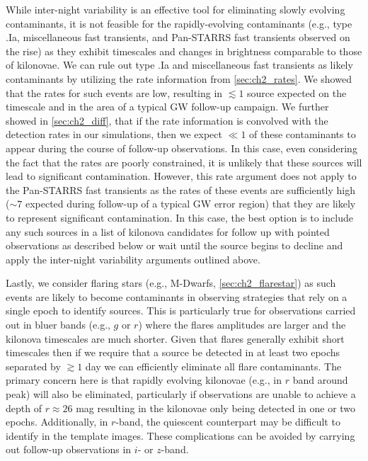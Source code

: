 While inter-night variability is an effective tool for eliminating slowly evolving contaminants, it is not feasible for the rapidly-evolving contaminants (e.g., type .Ia, miscellaneous fast transients, and Pan-STARRS fast transients observed on the rise) as they exhibit timescales and changes in brightness comparable to those of kilonovae. We can rule out type .Ia and miscellaneous fast transients as likely contaminants by utilizing the rate information from \cref{sec:ch2_rates}. We showed that the rates for such events are low, resulting in $\lesssim1$ source expected on the timescale and in the area of a typical GW follow-up campaign. We further showed in \cref{sec:ch2_diff}, that if the rate information is convolved with the detection rates in our simulations, then we expect $\ll 1$ of these contaminants to appear during the course of follow-up observations. In this case, even considering the fact that the rates are poorly constrained, it is unlikely that these sources will lead to significant contamination. However, this rate argument does not apply to the Pan-STARRS fast transients as the rates of these events are sufficiently high ($\sim 7$ expected during follow-up of a typical GW error region) that they are likely to represent significant contamination. In this case, the best option is to include any such sources in a list of kilonova candidates for follow up with pointed observations as described below or wait until the source begins to decline and apply the inter-night variability arguments outlined above.

Lastly, we consider flaring stars (e.g., M-Dwarfs, \cref{sec:ch2_flarestar}) as such events are likely to become contaminants in observing strategies that rely on a single epoch to identify sources. This is particularly true for observations carried out in bluer bands (e.g., $g$ or $r$) where the flares amplitudes are larger and the kilonova timescales are much shorter. Given that flares generally exhibit short timescales \citep[minutes to hours][]{Berger+13} then if we require that a source be detected in at least two epochs separated by $\gtrsim1$ day we can efficiently eliminate all flare contaminants. The primary concern here is that rapidly evolving kilonovae (e.g., in $r$ band around peak) will also be eliminated, particularly if observations are unable to achieve a depth of $r\approx26$ mag resulting in the kilonovae only being detected in one or two epochs. Additionally, in $r$-band, the quiescent counterpart may be difficult to identify in the template images. These complications can be avoided by carrying out follow-up observations in $i$- or $z$-band.

